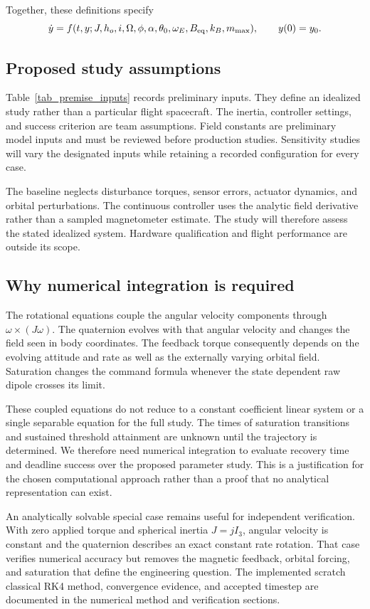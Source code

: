 Together, these definitions specify
\[
\dot y=f(t,y;J,h_o,i,\Omega,\phi,\alpha,\theta_0,
\omega_E,B_{\rm eq},k_B,m_{\max}),
\qquad y(0)=y_0.
\]

\subsection{Proposed study assumptions}
Table~\ref{tab_premise_inputs} records preliminary inputs. They define an idealized study rather than a particular flight spacecraft. The inertia, controller settings, and success criterion are team assumptions. Field constants are preliminary model inputs and must be reviewed before production studies. Sensitivity studies will vary the designated inputs while retaining a recorded configuration for every case.



The baseline neglects disturbance torques, sensor errors, actuator dynamics, and orbital perturbations. The continuous controller uses the analytic field derivative rather than a sampled magnetometer estimate. The study will therefore assess the stated idealized system. Hardware qualification and flight performance are outside its scope.

\subsection{Why numerical integration is required}
The rotational equations couple the angular velocity components through \(\omega\times(J\omega)\). The quaternion evolves with that angular velocity and changes the field seen in body coordinates. The feedback torque consequently depends on the evolving attitude and rate as well as the externally varying orbital field. Saturation changes the command formula whenever the state dependent raw dipole crosses its limit.

These coupled equations do not reduce to a constant coefficient linear system or a single separable equation for the full study. The times of saturation transitions and sustained threshold attainment are unknown until the trajectory is determined. We therefore need numerical integration to evaluate recovery time and deadline success over the proposed parameter study. This is a justification for the chosen computational approach rather than a proof that no analytical representation can exist.

An analytically solvable special case remains useful for independent verification. With zero applied torque and spherical inertia \(J=jI_3\), angular velocity is constant and the quaternion describes an exact constant rate rotation. That case verifies numerical accuracy but removes the magnetic feedback, orbital forcing, and saturation that define the engineering question. The implemented scratch classical RK4 method, convergence evidence, and accepted timestep are documented in the numerical method and verification sections.


